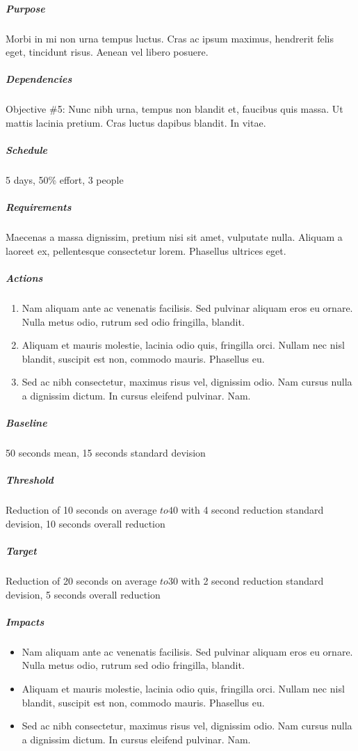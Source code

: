			\subparagraph{Purpose} Morbi in mi non urna tempus luctus. Cras ac ipsum maximus, hendrerit felis eget, tincidunt risus. Aenean vel libero posuere.

			\subparagraph{Dependencies} Objective \#5: Nunc nibh urna, tempus non blandit et, faucibus quis massa. Ut mattis lacinia pretium. Cras luctus dapibus blandit. In vitae.

			\subparagraph{Schedule} 5 days, 50\% effort, 3 people

			\subparagraph{Requirements} Maecenas a massa dignissim, pretium nisi sit amet, vulputate nulla. Aliquam a laoreet ex, pellentesque consectetur lorem. Phasellus ultrices eget.

			\subparagraph{Actions} 
				\begin{enumerate}
					\item Nam aliquam ante ac venenatis facilisis. Sed pulvinar aliquam eros eu ornare. Nulla metus odio, rutrum sed odio fringilla, blandit.
					\item Aliquam et mauris molestie, lacinia odio quis, fringilla orci. Nullam nec nisl blandit, suscipit est non, commodo mauris. Phasellus eu.
					\item Sed ac nibh consectetur, maximus risus vel, dignissim odio. Nam cursus nulla a dignissim dictum. In cursus eleifend pulvinar. Nam.
				\end{enumerate}
				
			\subparagraph{Baseline} 50 seconds mean, 15 seconds standard devision

			\subparagraph{Threshold} Reduction of 10 seconds on average \(to 40\) with 4 second reduction standard devision, 10 seconds overall reduction 

			\subparagraph{Target} Reduction of 20 seconds on average \(to 30\) with 2 second reduction standard devision, 5 seconds overall reduction 

			\subparagraph{Impacts} 
				\begin{itemize}
					\item Nam aliquam ante ac venenatis facilisis. Sed pulvinar aliquam eros eu ornare. Nulla metus odio, rutrum sed odio fringilla, blandit.
					\item Aliquam et mauris molestie, lacinia odio quis, fringilla orci. Nullam nec nisl blandit, suscipit est non, commodo mauris. Phasellus eu.
					\item Sed ac nibh consectetur, maximus risus vel, dignissim odio. Nam cursus nulla a dignissim dictum. In cursus eleifend pulvinar. Nam.
				\end{itemize}


